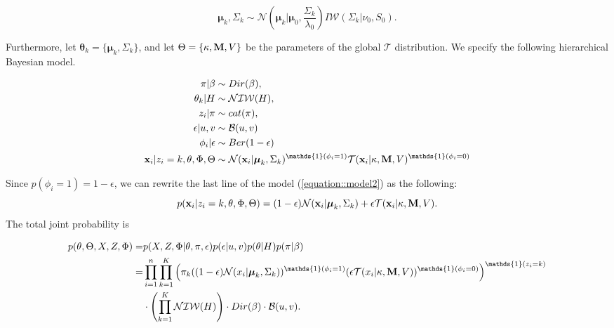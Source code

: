 \documentclass[12pt,english]{article}\usepackage[]{graphicx}\usepackage[]{color}
\begin{document}
\begin{equation} \label{equation::prior}
\boldsymbol{\mu}_k, \Sigma_k\sim \mathcal{N}\left(\boldsymbol{\mu}_k|\boldsymbol{\mu}_0, \frac{\Sigma_{k}}{\lambda_0}\right)I\mathcal{W}\left(\Sigma_{k}|\nu_0, S_0\right).
\end{equation}

Furthermore, let
$\boldsymbol{\theta}_k = \{\boldsymbol{\mu}_k, \Sigma_{k}\}$, and let
$\Theta = \{\kappa, {\bf M},V\}$ be the parameters of the global
$\mathcal{T}$ distribution. We specify the following hierarchical
Bayesian model.

\begin{equation}\label{equation::model2}
\begin{split}
\pi|\beta &\sim Dir(\beta),\\
\theta_k|H &\sim \mathcal{NIW}(H),\\
z_i|\pi & \sim cat(\pi), \\
\epsilon|u,v & \sim \mathcal{B}(u,v)  \\
\phi_i|\epsilon & \sim Ber(1-\epsilon) \\
{\bf x}_i|z_i = k,\theta, \Phi , \Theta & \sim \mathcal{N}({\bf x}_i|\boldsymbol{\mu}_k, \Sigma_k)^{\mathds{1}(\phi_i = 1)}\mathcal{T}({\bf x}_i|\kappa, {\bf M}, V)^{\mathds{1}(\phi_i = 0)}
\end{split}
\end{equation}

Since $p(\phi_i = 1) = 1-\epsilon$, we can rewrite the last line of
the model (\ref{equation::model2}) as the following:
\[p({\bf x}_i|z_i = k,\theta, \Phi , \Theta) = (1-\epsilon) \mathcal{N}({\bf x}_i|\boldsymbol{\mu}_k, \Sigma_k) + \epsilon \mathcal{T}({\bf x}_i|\kappa, {\bf M}, V).\]
The total joint probability is

\begin{equation}\label{equation::likelihood2}
\begin{split}
p(\theta,\Theta, X, Z, \Phi)  = &p(X,Z,\Phi|\theta,\pi, \epsilon)p(\epsilon|u,v)p(\theta|H)p(\pi|\beta)\\
=  & \prod_{i=1}^{n}\prod_{k=1}^{K}\left(\pi_k((1-\epsilon)\mathcal{N}(x_i|\boldsymbol{\mu}_k, \Sigma_k))^{\mathds{1}(\phi_i = 1)}(\epsilon \mathcal{T}(x_i|\kappa, {\bf M}, V))^{\mathds{1}(\phi_i = 0)}\right)^{\mathds{1}(z_i=k)}\\
&\cdot \left(\prod_{k=1}^{K}\mathcal{NIW}(H)\right)\cdot Dir(\beta)\cdot \mathcal{B}(u,v).
\end{split}
\end{equation}
\end{document}
